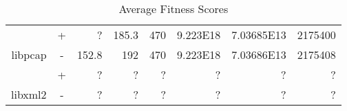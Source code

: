 \begin{table}[H]
\begin{tabular}{|r|c|r|r|r|r|r|r|}
                               & +                                                                           &              ?                                                              &                          185.3                                                &                                470                                           &                          9.223E18                                          &                          7.03685E13                                             &                           2175400                                              \\ \cline{2-8} 
\multirow{-2}{*}{libpcap}      & \cellcolor[HTML]{C0C0C0}-                                                   & \cellcolor[HTML]{C0C0C0} 152.8                                              & \cellcolor[HTML]{C0C0C0} 192                                                  & \cellcolor[HTML]{C0C0C0} 470                                                 & \cellcolor[HTML]{C0C0C0} 9.223E18                                          & \cellcolor[HTML]{C0C0C0} 7.03686E13                                             & \cellcolor[HTML]{C0C0C0} 2175408                                               \\ \hline \hline
                               & +                                                                           &       ?                                                                     &                              ?                                                &                                 ?                                            &                                        ?                                   &                                         ?                                       &                                      ?                                         \\ \cline{2-8} 
\multirow{-2}{*}{libxml2}      & \cellcolor[HTML]{C0C0C0}-                                                   & \cellcolor[HTML]{C0C0C0}    ?                                               & \cellcolor[HTML]{C0C0C0} ?                                                    & \cellcolor[HTML]{C0C0C0}  ?                                                  & \cellcolor[HTML]{C0C0C0}    ?                                              & \cellcolor[HTML]{C0C0C0}  ?                                                     & \cellcolor[HTML]{C0C0C0}   ?                                                   \\ \hline
\end{tabular}
\caption{Average Fitness Scores}
\label{tbl:fitness}
\end{table}

